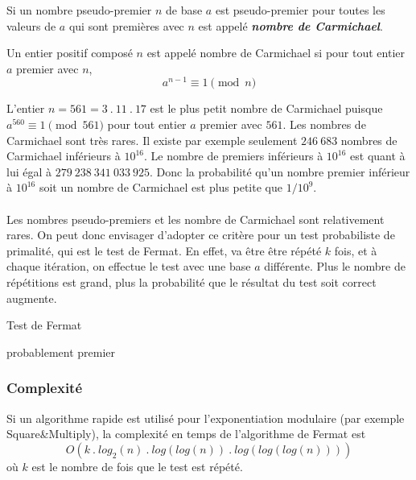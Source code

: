 \begin{itemize}
				Si un nombre pseudo-premier $n$ de base $a$ est pseudo-premier pour toutes les valeurs de $a$ qui sont premières avec $n$ est appelé \textit{\textbf{nombre de Carmichael}}. 
			
					\vspace{-1.5em}\begin{adjustwidth}{1.5cm}{1.5cm} 
					\begin{Def}
						\label{Carmich}
						Un entier positif composé $n$ est appelé nombre de Carmichael si pour tout entier $a$ premier avec $n$,
						\[a^{n-1}\equiv 1 \pmod n\]
					\end{Def}
					\end{adjustwidth}\vspace{0.5em}
					
				L'entier $n = 561 = 3\ .\ 11\ .\ 17$ est le plus petit nombre de Carmichael puisque $a^{560} \equiv 1 \pmod 561$ pour tout entier $a$ premier avec $561$. Les nombres de Carmichael sont très rares. Il existe par exemple seulement $246\ 683$ nombres de Carmichael inférieurs à $10^{16}$. Le nombre de premiers inférieurs à $10^{16}$ est quant à lui égal à $279\ 238\ 341\ 033\ 925$. Donc la probabilité qu'un nombre premier inférieur à $10^{16}$ soit un nombre de Carmichael est plus petite que $1/10^{9}$.
			
		\end{itemize}
		
		\paragraph{}Les nombres pseudo-premiers et les nombre de Carmichael sont relativement rares. On peut donc envisager d'adopter ce critère pour un test probabiliste de primalité, qui est le test de Fermat. En effet, va être être répété $k$ fois, et à chaque itération, on effectue le test avec une base $a$ différente. Plus le nombre de répétitions est grand, plus la probabilité que le résultat du test soit correct augmente.\\
		
		\begin{algorithm}[H]
			\caption{Test de Fermat}\label{TF}
		\Retour probablement premier\;
		\end{algorithm}
		
		
	\subsubsection{Complexité}
		Si un algorithme rapide est utilisé pour l'exponentiation modulaire (par exemple Square\&Multiply), la complexité en temps de l'algorithme de Fermat est
		\[O(k\ .\ log_{2}(n)\ .\ log(log(n))\ .\ log(log(log(n))))\]
		où $k$ est le nombre de fois que le test est répété.
	
